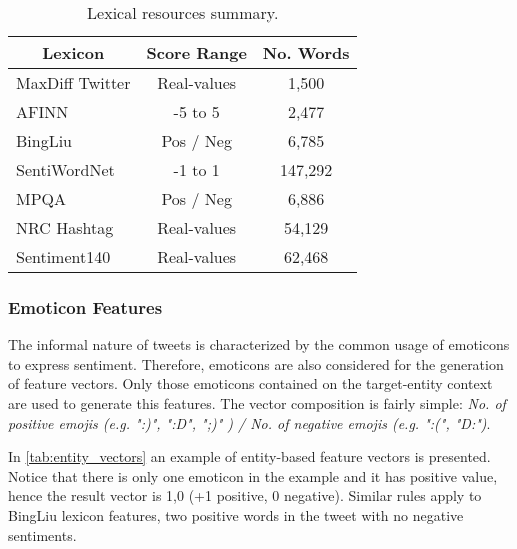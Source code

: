 \begin{table}[H]
\centering
\caption{Lexical resources summary.}
\label{tab:lexical_resources}
\begin{tabular}{|l|c|c|}
\hline
\multicolumn{1}{|c|}{\textbf{Lexicon}} & \textbf{Score Range} & \textbf{No. Words} \\ \hline
MaxDiff Twitter                        & Real-values          & 1,500              \\ \hline
AFINN                                  & -5 to 5              & 2,477              \\ \hline
BingLiu                                & Pos / Neg            & 6,785              \\ \hline
SentiWordNet                           & -1 to 1              & 147,292            \\ \hline
MPQA                                   & Pos / Neg            & 6,886              \\ \hline
NRC Hashtag                            & Real-values          & 54,129             \\ \hline
Sentiment140                           & Real-values          & 62,468             \\ \hline
\end{tabular}
\end{table}

\pagebreak

\subsubsection{Emoticon Features}

The informal nature of tweets is characterized by the common usage of emoticons to express sentiment. Therefore, emoticons are also considered for the generation of feature vectors. Only those emoticons contained on the target-entity context are used to generate this features. The vector composition is fairly simple: \textit{No. of positive emojis (e.g. ":)", ":D", ";)" ) / No. of negative emojis (e.g. ":(", "D:")}.

In \autoref{tab:entity_vectors} an example of entity-based feature vectors is presented. Notice that there is only one emoticon in the example and it has positive value, hence the result vector is {1,0} (+1 positive, 0 negative). Similar rules apply to BingLiu lexicon features, two positive words in the tweet with no negative sentiments. 

